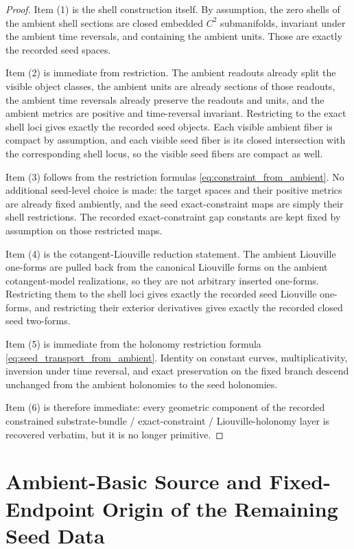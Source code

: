 \documentclass[11pt]{article}
\begin{document}
\begin{proof}
Item (1) is the shell construction itself. By assumption, the zero shells of the ambient shell sections are closed embedded \(C^2\) submanifolds, invariant under the ambient time reversals, and containing the ambient units. Those are exactly the recorded seed spaces.

Item (2) is immediate from restriction. The ambient readouts already split the visible object classes, the ambient units are already sections of those readouts, the ambient time reversals already preserve the readouts and units, and the ambient metrics are positive and time-reversal invariant. Restricting to the exact shell loci gives exactly the recorded seed objects. Each visible ambient fiber is compact by assumption, and each visible seed fiber is its closed intersection with the corresponding shell locus, so the visible seed fibers are compact as well.

Item (3) follows from the restriction formulas \eqref{eq:constraint_from_ambient}. No additional seed-level choice is made: the target spaces and their positive metrics are already fixed ambiently, and the seed exact-constraint maps are simply their shell restrictions. The recorded exact-constraint gap constants are kept fixed by assumption on those restricted maps.

Item (4) is the cotangent-Liouville reduction statement. The ambient Liouville one-forms are pulled back from the canonical Liouville forms on the ambient cotangent-model realizations, so they are not arbitrary inserted one-forms. Restricting them to the shell loci gives exactly the recorded seed Liouville one-forms, and restricting their exterior derivatives gives exactly the recorded closed seed two-forms.

Item (5) is immediate from the holonomy restriction formula \eqref{eq:seed_transport_from_ambient}. Identity on constant curves, multiplicativity, inversion under time reversal, and exact preservation on the fixed branch descend unchanged from the ambient holonomies to the seed holonomies.

Item (6) is therefore immediate: every geometric component of the recorded constrained substrate-bundle / exact-constraint / Liouville-holonomy layer is recovered verbatim, but it is no longer primitive.
\end{proof}

\section{Ambient-Basic Source and Fixed-Endpoint Origin of the Remaining Seed Data}
\end{document}
